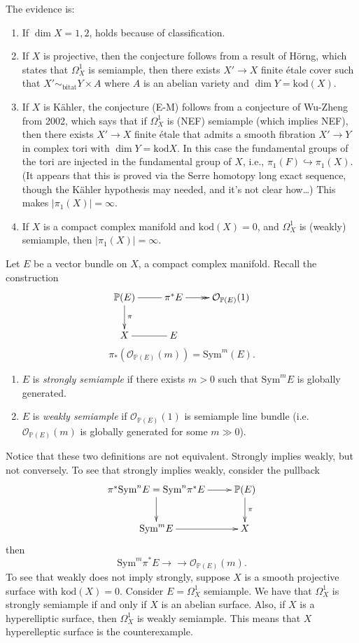 The evidence is:
\begin{enumerate}
\item If $\dim X=1,2$, holds because of
classification.
\item If $X$ is projective, then the
conjecture follows from
a result of Hörng, which states that
$\Omega_X^1$ is semiample,
then there exists $X'\to X$ finite étale
cover
such that $X'\sim_{\text{bitat}}Y\times A$
where $A$
is an abelian variety and  $\dim
Y=\text{kod}(X)$.
\item If $X$ is Kähler, the conjecture (E-M)
follows
from a conjecture of Wu-Zheng from 2002,
which says that
if  $\Omega^1_X$ is (NEF) semiample (which
implies NEF), then
there exists $X' \to X$ finite étale that
admits a smooth fibration
$X' \to Y$ in complex tori with $\dim
Y=\text{kod}X$.
In this case the fundamental groups of the
tori are injected
in the fundamental group of $X$, i.e.,
$\pi_1(F) \hookrightarrow \pi_1(X)$.
(It appears that this is proved via the Serre
homotopy
long exact sequence, though the Kähler
hypothesis may needed, and
it's not clear how…)
This makes $|\pi_1(X)|=\infty$.

\item If $X$ is a compact complex manifold
and $\text{kod}(X)=0$,
and $\Omega_X^1$ is (weakly) semiample, then
$|\pi_1(X)|=\infty$.
\end{enumerate}

\noindent

\begin{definition}
\label{definition-}
Let $E$ be a vector bundle on $X$, a compact
complex manifold.
Recall the construction
$$
\xymatrix{
\mathbb{P}(E)\ar[d]^{\pi}\ar@{-}[r]&\pi^*
E\ar@{->>}[r]
&\mathcal{O}_{\mathbb{P}(E)}(1)\\
X\ar@{-}[r]&E
}
$$
$$
\pi_*(\mathcal{O}_{\mathbb{P}(E)}(m))=
\text{Sym}^m(E).
$$
\begin{enumerate}
\item $E$ is {\it strongly semiample} if
there exists $m>0$
such that $\text{Sym}^mE$ is globally
generated.
\item $E$ is {\it weakly semiample} if
$\mathcal{O}_{\mathbb{P}(E)}(1)$ is semiample
line bundle
(i.e. $\mathcal{O}_{\mathbb{P}(E)}(m)$ is
globally generated
for some $m\gg 0$).
\end{enumerate}
\end{definition}

\noindent
Notice that these two definitions are not
equivalent.
Strongly implies weakly, but not conversely.
To see that strongly implies weakly, consider
the pullback
$$
\xymatrix{
\pi^*\text{Sym}^nE=\text{Sym}^n\pi^*E\ar[r]
\ar[d]&\mathbb{P}(E)\ar[d]^{\pi}\\
\text{Sym}^mE\ar[r]&X
}
$$
then
 $$
\text{Sym}^m\pi^* E
\to\!\!\!\!\!\to\mathcal{O}
_{\mathbb{P}(E)}(m).
$$
To see that weakly does not imply strongly,
suppose $X$ is a smooth projective
surface with $\text{kod}(X)=0$.
Consider $E=\Omega_X^1$ semiample. We have
that $\Omega_X^1$
is strongly semiample if and only if $X$ is
an abelian surface.
Also, if $X$ is a hyperelliptic surface, then
$\Omega_X^1$
is weakly semiample.
This means that $X$ hyperelleptic surface is
the counterexample.

